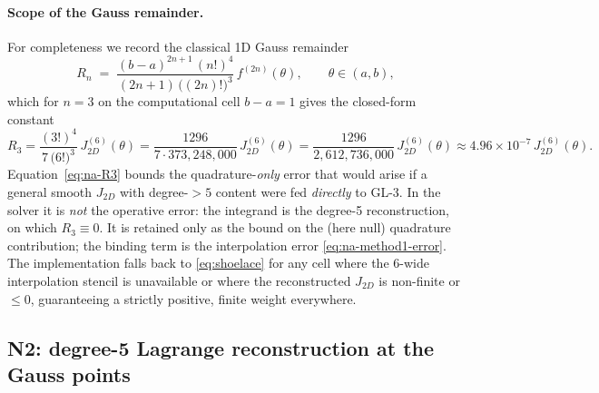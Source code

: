 \documentclass[11pt]{article}
\theoremstyle{definition}
\theoremstyle{remark}
\begin{document}
\paragraph{Scope of the Gauss remainder.}
For completeness we record the classical 1D Gauss remainder
\begin{equation}
  R_n \;=\; \frac{(b-a)^{2n+1}\,(n!)^4}
                 {(2n+1)\,\bigl((2n)!\bigr)^3}\,
            f^{(2n)}(\theta),\qquad \theta\in(a,b),
  \label{eq:na-gauss-remainder}
\end{equation}
which for $n=3$ on the computational cell $b-a=1$ gives the closed-form constant
\begin{equation}
  R_3 = \frac{(3!)^4}{7\,\bigl(6!\bigr)^3}\,J_{2D}^{(6)}(\theta)
      = \frac{1296}{7\cdot 373{,}248{,}000}\,J_{2D}^{(6)}(\theta)
      = \frac{1296}{2{,}612{,}736{,}000}\,J_{2D}^{(6)}(\theta)
      \approx 4.96\times10^{-7}\,J_{2D}^{(6)}(\theta).
  \label{eq:na-R3}
\end{equation}
Equation~\eqref{eq:na-R3} bounds the quadrature-\emph{only} error that would arise if
a general smooth $J_{2D}$ with degree-$>5$ content were fed \emph{directly} to GL-3.
In the solver it is \emph{not} the operative error: the integrand is the degree-5
reconstruction, on which $R_3\equiv0$. It is retained only as the bound on the (here
null) quadrature contribution; the binding term is the interpolation error
\eqref{eq:na-method1-error}. The implementation falls back to \eqref{eq:shoelace} for
any cell where the 6-wide interpolation stencil is unavailable or where the
reconstructed $J_{2D}$ is non-finite or $\le0$, guaranteeing a strictly positive,
finite weight everywhere.

\subsection{N2: degree-5 Lagrange reconstruction at the Gauss points}
\label{sec:na-N2}
\end{document}
